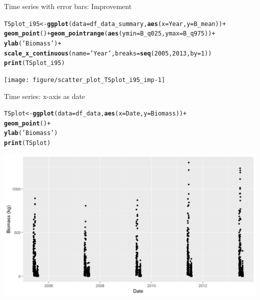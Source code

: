 \documentclass{beamer}\usepackage[]{graphicx}\usepackage[]{color}
\makeatletter
\newcommand{\hlnum}[1]{\textcolor[rgb]{0.686,0.059,0.569}{#1}}%
\newcommand{\hlstr}[1]{\textcolor[rgb]{0.192,0.494,0.8}{#1}}%
\newcommand{\hlopt}[1]{\textcolor[rgb]{0,0,0}{#1}}%
\newcommand{\hlstd}[1]{\textcolor[rgb]{0.345,0.345,0.345}{#1}}%
\newcommand{\hlkwb}[1]{\textcolor[rgb]{0.69,0.353,0.396}{#1}}%
\newcommand{\hlkwc}[1]{\textcolor[rgb]{0.333,0.667,0.333}{#1}}%
\newcommand{\hlkwd}[1]{\textcolor[rgb]{0.737,0.353,0.396}{\textbf{#1}}}%
\newenvironment{kframe}{%
 \def\at@end@of@kframe{}%
 \ifinner\ifhmode%
  \def\at@end@of@kframe{\end{minipage}}%
  \begin{minipage}{\columnwidth}%
 \fi\fi%
 \def\FrameCommand##1{\hskip\@totalleftmargin \hskip-\fboxsep
 \colorbox{shadecolor}{##1}\hskip-\fboxsep
     \hskip-\linewidth \hskip-\@totalleftmargin \hskip\columnwidth}%
 \MakeFramed {\advance\hsize-\width
   \@totalleftmargin\z@ \linewidth\hsize
   \@setminipage}}%
 {\par\unskip\endMakeFramed%
 \at@end@of@kframe}
\newenvironment{knitrout}{}{} %
\makeatother
\begin{document}
\begin{frame}[fragile]{Time series with error bars: Improvement}
\begin{knitrout}\footnotesize
{}\color{fgcolor}\begin{kframe}
\begin{alltt}
\hlstd{TSplot_i95} \hlkwb{<-} \hlkwd{ggplot}\hlstd{(}\hlkwc{data}\hlstd{=df_data_summary,} \hlkwd{aes}\hlstd{(}\hlkwc{x}\hlstd{=Year,} \hlkwc{y}\hlstd{=B_mean))} \hlopt{+}
  \hlkwd{geom_point}\hlstd{()} \hlopt{+} \hlkwd{geom_pointrange}\hlstd{(}\hlkwd{aes}\hlstd{(}\hlkwc{ymin} \hlstd{= B_q025,} \hlkwc{ymax} \hlstd{= B_q975))} \hlopt{+}
  \hlkwd{ylab}\hlstd{(}\hlstr{'Biomass'}\hlstd{)} \hlopt{+}
  \hlkwd{scale_x_continuous}\hlstd{(}\hlkwc{name} \hlstd{=} \hlstr{'Year'}\hlstd{,} \hlkwc{breaks} \hlstd{=} \hlkwd{seq}\hlstd{(}\hlnum{2005}\hlstd{,} \hlnum{2013}\hlstd{,} \hlkwc{by} \hlstd{=} \hlnum{1}\hlstd{))}
\hlkwd{print}\hlstd{(TSplot_i95)}
\end{alltt}
\end{kframe}

{\centering \texttt{[image: figure/scatter\_plot\_TSplot\_i95\_imp-1]} 

}



\end{knitrout}
\end{frame}


\begin{frame}[fragile]{Time series: x-axis as date}
\begin{knitrout}\footnotesize
{}\color{fgcolor}\begin{kframe}
\begin{alltt}
\hlstd{TSplot} \hlkwb{<-} \hlkwd{ggplot}\hlstd{(}\hlkwc{data}\hlstd{=df_data,} \hlkwd{aes}\hlstd{(}\hlkwc{x}\hlstd{=Date,} \hlkwc{y}\hlstd{=Biomass))} \hlopt{+}
  \hlkwd{geom_point}\hlstd{()} \hlopt{+}
  \hlkwd{ylab}\hlstd{(}\hlstr{'Biomass'}\hlstd{)}
\hlkwd{print}\hlstd{(TSplot)}
\end{alltt}
\end{kframe}

{\centering \includegraphics[width=.9\linewidth]{figure/TSplot_i95d1-1} 

}



\end{knitrout}
\end{frame}
\end{document}
